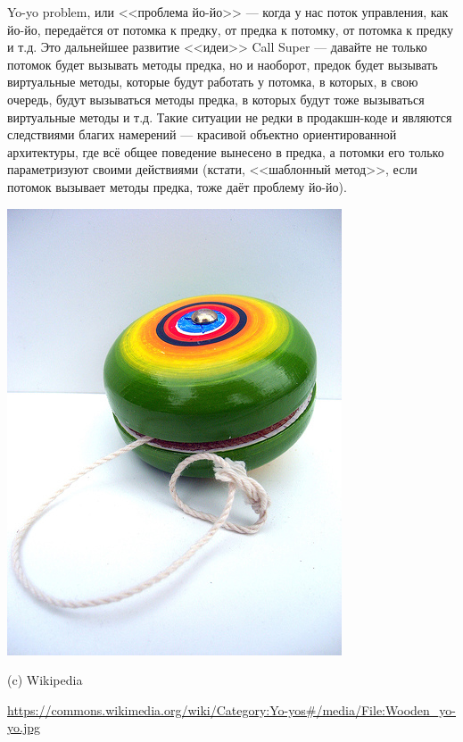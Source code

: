 \documentclass{../../text-style}
\begin{document}
\noindent\begin{minipage}{\textwidth}
    \begin{minipage}[c][6cm][c]{\dimexpr0.7\textwidth-0.5\Colsep\relax}
        Yo-yo problem, или <<проблема йо-йо>> --- когда у нас поток управления, как йо-йо, передаётся от потомка к предку, от предка к потомку, от потомка к предку и т.д. Это дальнейшее развитие <<идеи>> Call Super --- давайте не только потомок будет вызывать методы предка, но и наоборот, предок будет вызывать виртуальные методы, которые будут работать у потомка, в которых, в свою очередь, будут вызываться методы предка, в которых будут тоже вызываться виртуальные методы и т.д. Такие ситуации не редки в продакшн-коде и являются следствиями благих намерений --- красивой объектно ориентированной архитектуры, где всё общее поведение вынесено в предка, а потомки его только параметризуют своими действиями (кстати, <<шаблонный метод>>, если потомок вызывает методы предка, тоже даёт проблему йо-йо).
    \end{minipage}\hfill
    \begin{minipage}[c][6cm][c]{\dimexpr0.3\textwidth-0.5\Colsep\relax}
        \includegraphics[width=\textwidth]{yo-yo.png}

        \footnotesize{(c) Wikipedia}

        \tiny{\url{https://commons.wikimedia.org/wiki/Category:Yo-yos\#/media/File:Wooden\_yo-yo.jpg}}
    \end{minipage}%
\end{minipage}
\end{document}
